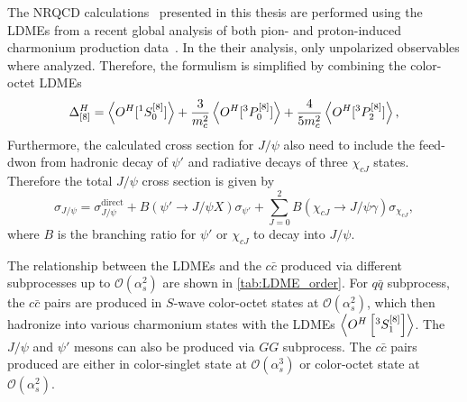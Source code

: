 \documentclass[../main.tex]{subfiles}
\begin{document}
The NRQCD calculations~\cite{chang2021} presented in this thesis are performed using the LDMEs
from a recent global analysis of both pion- and proton-induced charmonium production data~\cite{chang2023}.
In the their analysis, only unpolarized observables where analyzed.
Therefore, the formulism is simplified by combining the color-octet LDMEs
\begin{equation}
	\Delta^H_{[8]}=\expval{O^H[^1S_0^{\left[8\right]}]}+\frac{3}{m_c^2}\expval{O^H[^3P_0^{\left[8\right]}]}+\frac{4}{5m_c^2}\expval{O^H[^3P_2^{\left[8\right]}]},
\end{equation}
Furthermore, the calculated cross section for $J/\psi$ also need to include the feed-dwon from hadronic decay
of $\psi'$ and radiative decays of three $\chi_{cJ}$ states.
Therefore the total $J/\psi$ cross section is given by
\begin{equation}
	\sigma_{J/\psi}=\sigma_{J/\psi}^{\mathrm{direct}}+B\left(\psi'\to J/\psi X\right)\sigma_{\psi'} +\sum_{J=0}^2 B\left(\chi_{cJ}\to J/\psi\gamma\right) \sigma_{\chi_{cJ}},
\end{equation}
where $B$ is the branching ratio for $\psi'$ or $\chi_{cJ}$ to decay into $J/\psi$.

The relationship between the LDMEs and the $c\bar{c}$ produced via different
subprocesses up to $\mathcal{O}\left(\alpha_s^2\right)$ are shown in \cref{tab:LDME_order}.
For $q\bar{q}$ subprocess, the $c\bar{c}$ pairs are produced in
$S$-wave color-octet states at $\mathcal{O}\left(\alpha_s^2\right)$,
which then hadronize into various charmonium states with the LDMEs $\expval{O^H\left[^3 S_1^{[8]}\right]}$.
The $J/\psi$ and $\psi'$ mesons can also be produced via $GG$ subprocess.
The $c\bar{c}$ pairs produced are either in color-singlet
state at $\mathcal{O}\left(\alpha_s^3\right)$ or color-octet state at $\mathcal{O}\left(\alpha_s^2\right)$.
\end{document}
